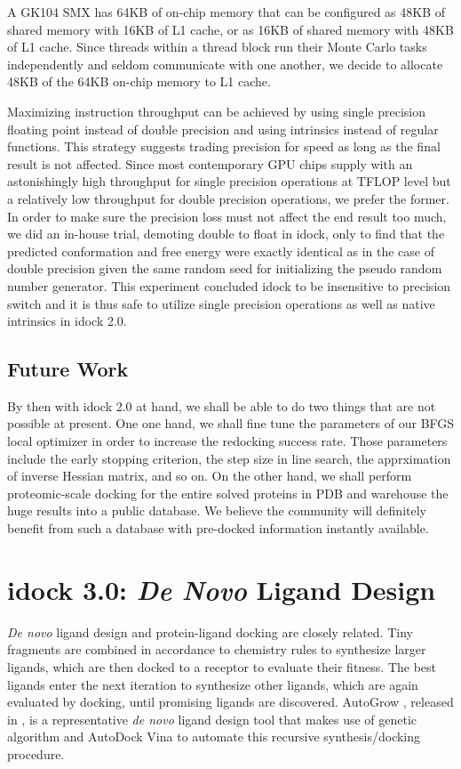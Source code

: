 A GK104 SMX has 64KB of on-chip memory that can be configured as 48KB of shared memory with 16KB of L1 cache, or as 16KB of shared memory with 48KB of L1 cache. Since threads within a thread block run their Monte Carlo tasks independently and seldom communicate with one another, we decide to allocate 48KB of the 64KB on-chip memory to L1 cache.

Maximizing instruction throughput can be achieved by using single precision floating point instead of double precision and using intrinsics instead of regular functions. This strategy suggests trading precision for speed as long as the final result is not affected. Since most contemporary GPU chips supply with an astonishingly high throughput for single precision operations at TFLOP level but a relatively low throughput for double precision operations, we prefer the former. In order to make sure the precision loss must not affect the end result too much, we did an in-house trial, demoting double to float in idock, only to find that the predicted conformation and free energy were exactly identical as in the case of double precision given the same random seed for initializing the pseudo random number generator. This experiment concluded idock to be insensitive to precision switch and it is thus safe to utilize single precision operations as well as native intrinsics in idock 2.0.

\subsection{Future Work}

By then with idock 2.0 at hand, we shall be able to do two things that are not possible at present. One one hand, we shall fine tune the parameters of our BFGS local optimizer in order to increase the redocking success rate. Those parameters include the early stopping criterion, the step size in line search, the apprximation of inverse Hessian matrix, and so on. On the other hand, we shall perform proteomic-scale docking for the entire solved proteins in PDB \citep{540,537} and warehouse the huge results into a public database. We believe the community will definitely benefit from such a database with pre-docked information instantly available.

\section{idock 3.0: \textit{De Novo} Ligand Design}

\textit{De novo} ligand design and protein-ligand docking are closely related. Tiny fragments are combined in accordance to chemistry rules to synthesize larger ligands, which are then docked to a receptor to evaluate their fitness. The best ligands enter the next iteration to synthesize other ligands, which are again evaluated by docking, until promising ligands are discovered. AutoGrow \citep{466}, released in \citeyear{466}, is a representative \textit{de novo} ligand design tool that makes use of genetic algorithm and AutoDock Vina \citep{595} to automate this recursive synthesis/docking procedure.

